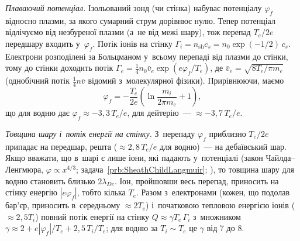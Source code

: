 \emph{Плаваючий потенціал.} Ізольований зонд (чи стінка) набуває потенціалу $\varphi_f$ відносно плазми, за якого
сумарний струм дорівнює нулю. Тепер потенціал відлічуємо
від незбуреної плазми (а~не від межі шару), тож перепад $T_e/2e$ передшару входить у~$\varphi_f$. Потік іонів на стінку
$\Gamma_i=n_\mathrm{sh}c_s=n_0\exp(-1/2)\,c_s$. Електрони розподілені за Больцманом у~всьому перепаді від плазми
до стінки, тому до стінки доходить потік $\Gamma_e=\tfrac14n_0\bar v_e\exp(e\varphi_f/T_e)$, де
$\bar v_e=\sqrt{8T_e/\pi m_e}$ (однобічний потік $\tfrac14n\bar v$ відомий з~молекулярної фізики). Прирівнюючи, маємо
\begin{equation}\label{eq:floating-potential}
	\varphi_f=-\frac{T_e}{2e}\left(\ln\frac{m_i}{2\pi m_e}+1\right),
\end{equation}
що для водню дає $\varphi_f\approx-3{,}3\,T_e/e$, для дейтерію~--- $\approx-3{,}7\,T_e/e$.

\emph{Товщина шару і~потік енергії на стінку.} З~перепаду $\varphi_f$ приблизно $T_e/2e$ припадає на передшар, решта ($\approx2{,}8\,T_e/e$ для водню)~--- на
дебаївський шар. Якщо вважати, що в~шарі є лише іони, які падають у~потенціалі (закон Чайлда--Ленгмюра,
$\varphi\propto x^{4/3}$; задача~\ref{prb:SheathChildLangmuir}; \cite{chen2016introduction}), то товщина шару для водню становить
близько $2\lambda_{De}$.
Іон, пройшовши весь перепад, приносить на стінку енергію $|e\varphi_f|$, тобто
кілька $T_e$. Разом з~електронами (кожен, що подолав бар'єр, приносить в~середньому $\approx2T_e$) і~початковою
тепловою енергією іонів ($\approx2{,}5T_i$) повний потік енергії на стінку $Q\approx\gamma T_e\,\Gamma_i$ з~множником
$\gamma\approx2+e|\varphi_f|/T_e+2{,}5\,T_i/T_e$; для водню за $T_i\sim T_e$ це $\gamma$ від 7 до 8.

